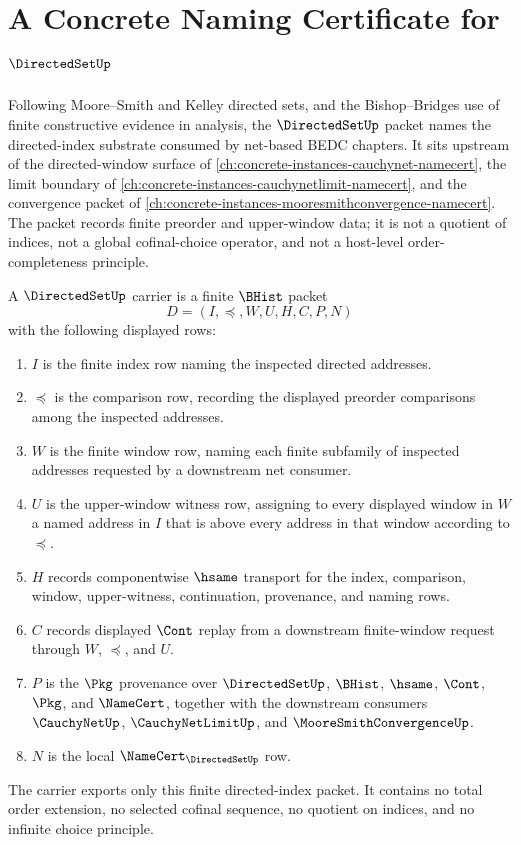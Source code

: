 \chapter{A Concrete Naming Certificate for $\DirectedSetUp$}
\label{ch:concrete-instances-directedset-namecert}

Following Moore--Smith and Kelley directed sets, and the Bishop--Bridges use of finite constructive evidence in analysis, the $\DirectedSetUp$ packet names the directed-index substrate consumed by net-based BEDC chapters. It sits upstream of the directed-window surface of \autoref{ch:concrete-instances-cauchynet-namecert}, the limit boundary of \autoref{ch:concrete-instances-cauchynetlimit-namecert}, and the convergence packet of \autoref{ch:concrete-instances-mooresmithconvergence-namecert}. The packet records finite preorder and upper-window data; it is not a quotient of indices, not a global cofinal-choice operator, and not a host-level order-completeness principle.

\begin{definition}
\label{def:directed-set-carrier}
A $\DirectedSetUp$ carrier is a finite $\BHist$ packet
$$
D=(I,\preceq,W,U,H,C,P,N)
$$
with the following displayed rows:
\begin{enumerate}
\item $I$ is the finite index row naming the inspected directed addresses.
\item $\preceq$ is the comparison row, recording the displayed preorder comparisons among the inspected addresses.
\item $W$ is the finite window row, naming each finite subfamily of inspected addresses requested by a downstream net consumer.
\item $U$ is the upper-window witness row, assigning to every displayed window in $W$ a named address in $I$ that is above every address in that window according to $\preceq$.
\item $H$ records componentwise $\hsame$ transport for the index, comparison, window, upper-witness, continuation, provenance, and naming rows.
\item $C$ records displayed $\Cont$ replay from a downstream finite-window request through $W$, $\preceq$, and $U$.
\item $P$ is the $\Pkg$ provenance over $\DirectedSetUp$, $\BHist$, $\hsame$, $\Cont$, $\Pkg$, and $\NameCert$, together with the downstream consumers $\CauchyNetUp$, $\CauchyNetLimitUp$, and $\MooreSmithConvergenceUp$.
\item $N$ is the local $\NameCert_{\DirectedSetUp}$ row.
\end{enumerate}
The carrier exports only this finite directed-index packet. It contains no total order extension, no selected cofinal sequence, no quotient on indices, and no infinite choice principle.
\end{definition}

